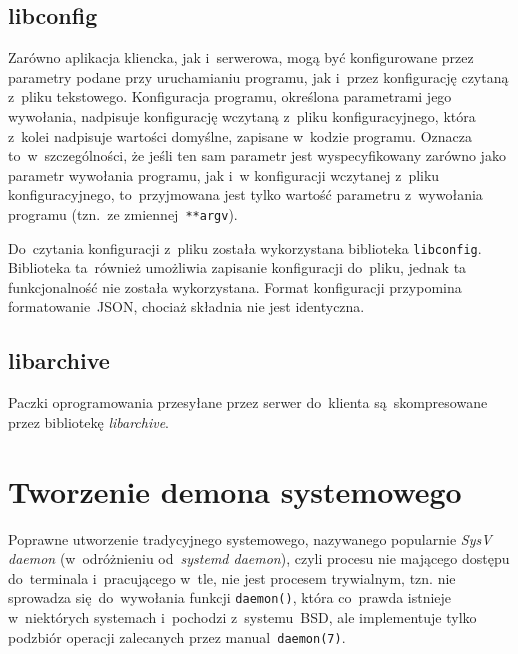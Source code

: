 \documentclass[thesis]{subfiles}
\begin{document}

\subsection{libconfig}

Zarówno aplikacja kliencka, jak i~serwerowa, mogą być konfigurowane przez parametry podane przy uruchamianiu programu, jak i~przez konfigurację czytaną z~pliku tekstowego. Konfiguracja programu, określona parametrami jego wywołania, nadpisuje konfigurację wczytaną z~pliku konfiguracyjnego, która z~kolei nadpisuje wartości domyślne, zapisane w~kodzie programu. Oznacza to~w~szczególności, że jeśli ten sam parametr jest wyspecyfikowany zarówno jako parametr wywołania programu, jak i~w konfiguracji wczytanej z~pliku konfiguracyjnego, to~przyjmowana jest tylko wartość parametru z~wywołania programu (tzn.~ze zmiennej~\texttt{**argv}).

Do~czytania konfiguracji z~pliku została wykorzystana biblioteka \texttt{libconfig}. Biblioteka ta~również umożliwia zapisanie konfiguracji do~pliku, jednak ta funkcjonalność nie została wykorzystana. Format konfiguracji przypomina formatowanie~JSON, chociaż składnia nie jest identyczna.


\subsection{libarchive}

Paczki oprogramowania przesyłane przez serwer do~klienta są~skompresowane przez bibliotekę \emph{libarchive}.


\section{Tworzenie demona systemowego}

Poprawne utworzenie tradycyjnego   systemowego, nazywanego popularnie \emph{SysV daemon} (w~odróżnieniu od~\emph{systemd daemon}), czyli procesu nie mającego dostępu do~terminala i~pracującego w~tle, nie jest procesem trywialnym, tzn. nie sprowadza się~do~wywołania funkcji \texttt{daemon()}, która co~prawda istnieje w~niektórych systemach i~pochodzi z~systemu~BSD, ale implementuje tylko podzbiór operacji zalecanych przez manual~\texttt{daemon(7)}.
\end{document}
